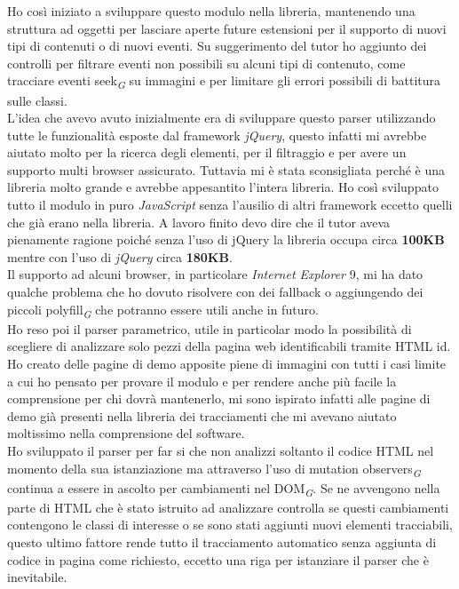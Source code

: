 \documentclass[a4paper, 12pt, twoside, openright]{book}
\newcommand{\gloss}[1]{#1\textsubscript{\textit{\tiny{G}}}}
\begin{document}
Ho così iniziato a sviluppare questo modulo nella libreria, mantenendo una struttura ad oggetti per lasciare aperte future estensioni per il supporto di nuovi tipi di contenuti o di nuovi eventi. Su suggerimento del tutor ho aggiunto dei controlli per filtrare eventi non possibili su alcuni tipi di contenuto, come tracciare eventi \gloss{seek} su immagini e per limitare gli errori possibili di battitura sulle classi.\\
L'idea che avevo avuto inizialmente era di sviluppare questo parser utilizzando tutte le funzionalità esposte dal framework \textit{jQuery}, questo infatti mi avrebbe aiutato molto per la ricerca degli elementi, per il filtraggio e per avere un supporto multi browser assicurato. Tuttavia mi è stata sconsigliata perché è una libreria molto grande e avrebbe appesantito l'intera libreria. Ho così sviluppato tutto il modulo in puro \textit{JavaScript} senza l'ausilio di altri framework eccetto quelli che già erano nella libreria. A lavoro finito devo dire che il tutor aveva pienamente ragione poiché senza l'uso di jQuery la libreria occupa circa \textbf{100KB} mentre con l'uso di \textit{jQuery} circa \textbf{180KB}.\\

Il supporto ad alcuni browser, in particolare \textit{Internet Explorer} 9, mi ha dato qualche problema che ho dovuto risolvere con dei fallback o aggiungendo dei piccoli \gloss{polyfill} che potranno essere utili anche in futuro.\\
Ho reso poi il parser parametrico, utile in particolar modo la possibilità di scegliere di analizzare solo pezzi della pagina web identificabili tramite HTML id.\\
Ho creato delle pagine di demo apposite piene di immagini con tutti i casi limite a cui ho pensato per provare il modulo e per rendere anche più facile la comprensione per chi dovrà mantenerlo, mi sono ispirato infatti alle pagine di demo già presenti nella libreria dei tracciamenti che mi avevano aiutato moltissimo nella comprensione del software.\\
Ho sviluppato il parser per far si che non analizzi soltanto il codice HTML nel momento della sua istanziazione ma attraverso l'uso di \gloss{mutation observers} continua a essere in ascolto per cambiamenti nel \gloss{DOM}. Se ne avvengono nella parte di HTML che è stato istruito ad analizzare controlla se questi cambiamenti contengono le classi di interesse o se sono stati aggiunti nuovi elementi tracciabili, questo ultimo fattore rende tutto il tracciamento automatico senza aggiunta di codice in pagina come richiesto, eccetto una riga per istanziare il parser che è inevitabile.\\
\end{document}
